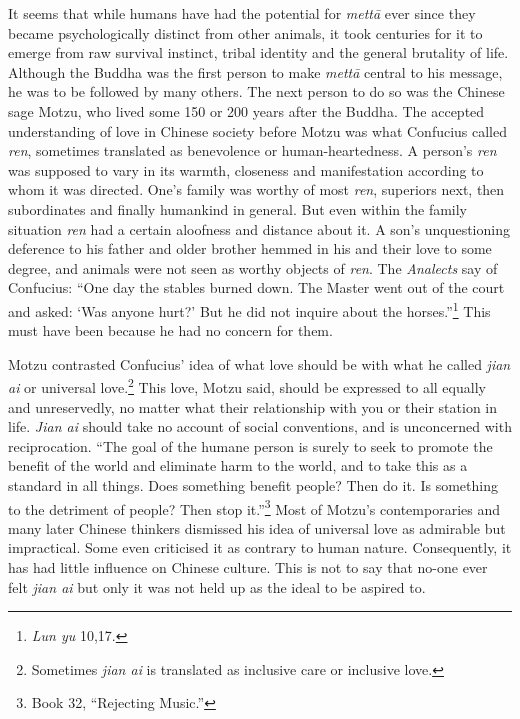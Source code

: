 \documentclass[10pt, openright]{book}
\begin{document}
It seems that while humans have had the potential for \textit{mettā} ever since they became psychologically distinct from other animals, it took centuries for it to emerge from raw survival instinct, tribal identity and the general brutality of life. Although the Buddha was the first person to make \textit{mettā} central to his message, he was to be followed by many others. The next person to do so was the Chinese sage Motzu, who lived some 150 or 200 years after the Buddha. The accepted understanding of love in Chinese society before Motzu was what Confucius called \textit{ren}, sometimes translated as benevolence or human-heartedness. A person’s \textit{ren} was supposed to vary in its warmth, closeness and manifestation according to whom it was directed. One’s family was worthy of most \textit{ren}, superiors next, then subordinates and finally humankind in general. But even within the family situation \textit{ren} had a certain aloofness and distance about it. A son’s unquestioning deference to his father and older brother hemmed in his and their love to some degree, and animals were not seen as worthy objects of \textit{ren}. The \textit{Analects} say of Confucius: “One day the stables burned down. The Master went out of the court and asked: ‘Was anyone hurt?’ But he did not inquire about the horses.”\footnote {\textit{Lun yu} 10,17.} This must have been because he had no concern for them.


Motzu contrasted Confucius’ idea of what love should be with what he called \textit{jian ai} or universal love.\footnote {Sometimes \textit{jian ai} is translated as inclusive care or inclusive love.} This love, Motzu said, should be expressed to all equally and unreservedly, no matter what their relationship with you or their station in life. \textit{Jian ai} should take no account of social conventions, and is unconcerned with reciprocation. “The goal of the humane person is surely to seek to promote the benefit of the world and eliminate harm to the world, and to take this as a standard in all things. Does something benefit people? Then do it. Is something to the detriment of people? Then stop it.”\footnote {Book 32, “Rejecting Music.”} Most of Motzu’s contemporaries and many later Chinese thinkers dismissed his idea of universal love as admirable but impractical. Some even criticised it as contrary to human nature. Consequently, it has had little influence on Chinese culture. This is not to say that no-one ever felt \textit{jian ai} but only it was not held up as the ideal to be aspired to.
\end{document}
